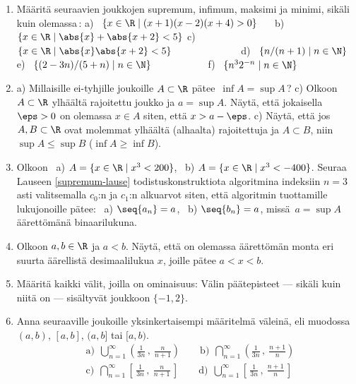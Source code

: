 \Harj
\begin{enumerate}

\item
Määritä seuraavien joukkojen supremum, infimum, maksimi ja minimi, sikäli kuin olemassa\,: 
\newline
a) \ $\{x\in\R \mid (x+1)(x-2)(x+4)>0\}\quad\ $ 
b) \ $\{x\in\R \mid \abs{x}+\abs{x+2}<5\}$ \newline
c) \ $\{x\in\R \mid \abs{x}\abs{x+2}<5\}\qquad\qquad\qquad\ \ $ 
d) \ $\{n/(n+1) \mid n\in\N\}$ \newline 
e) \ $\{(2-3n)/(5+n) \mid n\in\N\}\qquad\qquad\quad\ $
f) \ $\{n^3 2^{-n} \mid n\in\N\}$

\item \label{H-I-11: sup ja inf}
a) Millaisille ei-tyhjille joukoille $A\subset\R$ pätee $\,\inf A = \sup A$\,? \newline
c) Olkoon $A\subset\R$ ylhäältä rajoitettu joukko ja $a=\sup A$. Näytä, että jokaisella
$\eps>0$ on olemassa $x \in A$ siten, että $x > a-\eps$. \newline
c) Näytä, että jos $A,B\subset\R$ ovat molemmat ylhäältä (alhaalta) rajoitettuja ja
$A \subset B$, niin $\sup A \le \sup B$ ($\inf A \ge \inf B$).

\item
Olkoon \ a) $A=\{x\in\R \mid x^3<200\}$, \ b) $A=\{x\in\R \mid x^3<-400\}$. Seuraa Lauseen
\ref{supremum-lause} todistuskonstruktiota algoritmina indeksiin $n=3$ asti valitsemalla 
$c_0$:n ja $c_1$:n alkuarvot siten, että algoritmin tuottamille lukujonoille pätee: \ 
a) $\seq{a_n}=a$, \ b) $\seq{b_n}=a$, missä $\,a=\sup A\,$ äärettömänä binaarilukuna.

\item \label{H-I-11: rationaaliluvut välillä}
Olkoon $a,b\in\R$ ja $a<b$. Näytä, että on olemassa äärettömän monta eri suurta äärellistä 
desimaalilukua $x$, joille pätee $a<x<b$.

\item
Määritä kaikki välit, joilla on ominaisuus: Välin päätepisteet --- sikäli kuin niitä on --- 
sisältyvät joukkoon $\{-1,2\}$.

\item
Anna seuraaville joukoille yksinkertaisempi määritelmä väleinä, eli muodossa $(a,b)$, $[a,b]$,
$(a,b]$ tai $[a,b)$.
\begin{align*}
&\text{a)}\ \ \bigcup_{n=1}^\infty \left(\frac{1}{3n}\,,\ \frac{n}{n+1}\right) \qquad
 \text{b)}\ \ \bigcap_{n=1}^\infty \left(\frac{1}{3n}\,,\ \frac{n+1}{n}\right) \\
&\text{c)}\ \ \bigcap_{n=1}^\infty \left[\,\frac{1}{3n}\,,\ \frac{n}{n+1}\,\right] \qquad
 \text{d)}\ \ \bigcup_{n=1}^\infty \left[\,\frac{1}{3n}\,,\ \frac{n+1}{n}\,\right]
\end{align*}


\end{enumerate}
